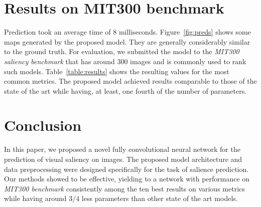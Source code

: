\documentclass[10pt,twocolumn,letterpaper]{article}
\begin{document}
\section{Results on MIT300 benchmark}
Prediction took an average time of 8 milliseconds. Figure~\ref{fig:preds} shows some maps generated by the proposed model.
They are generally considerably similar to the ground truth. For evaluation, we submitted the model to the \emph{MIT300 saliency benchmark} that has around 300 images and is commonly used to rank such models. Table~\ref{table:results} shows the resulting values for the most common metrics. 
The proposed model achieved results comparable to those of the state of the art while having, at least, one fourth of the number of parameters.

\section{Conclusion}
In this paper, we proposed a novel fully convolutional neural network for the
prediction of visual saliency on images. The proposed model architecture and data preprocessing were designed specifically
for the task of salience prediction. Our methods showed to be effective, yielding to a network with performance
on \emph{MIT300 benchmark} consistently among the ten best results on various
metrics while having around $3/4$  less parameters than other state of
the art models.
\end{document}
